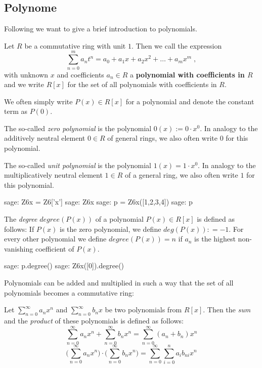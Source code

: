 \subsection{Polynome}
Following \cite{LK} we want to give a brief introduction to polynomials. 
\begin{definition}[Polynomials]
Let $R$ be a commutative ring with unit $1$.
Then we call the expression
\begin{equation}
\sum _{n = 0} ^{m}{a} _{n}{t} ^{n} ={a} _{0} +{a} _{1} x +{a} _{2} x ^ 2 + \dots + a_m x ^ m \;,
\end{equation}
with unknown $x $ and coefficients $ a_n \in R $ a
\textbf{polynomial with coefficients in $R$} and we write $ R [x] $ for the set of all polynomials with coefficients in $R$.
\end{definition}
We often simply write $ P (x) \in R[x]$ for a polynomial and denote the constant term as $ P(0)$.
\begin{example}
\label{def: zero polynomial}
The so-called \textit{zero polynomial} is the polynomial $0(x):=0\cdot x^0$. In analogy to the additively neutral element $ 0 \in R $ of general rings, we also often write $ 0 $ for this polynomial.

The so-called \textit{unit polynomial} is the polynomial $1(x)= 1\cdot x^0$. In analogy to the multiplicatively neutral element $ 1 \in R $ of a general ring, we also often write $ 1 $ for this polynomial.
\end{example}
\begin{sagecommandline}
sage: Z6x = Z6['x']
sage: Z6x
sage: p = Z6x([1,2,3,4])
sage: p
\end{sagecommandline}
\begin{definition}[degree] 
The \textit{degree} $ degree (P (x)) $ of a polynomial
$ P (x) \in R [x] $ is defined as follows: If $ P (x) $ is the zero polynomial, we define $ deg(P (x)): = - 1 $. For every other polynomial we define $ degree (P (x)) = n $ if $ a_n $ is the highest non-vanishing coefficient of $ P (x) $.
\end{definition}
\begin{sagecommandline}
sage: p.degree()
sage: Z6x([0]).degree()
\end{sagecommandline}
Polynomials can be added and multiplied in such a way that the set of all polynomials becomes a commutative ring:
\begin{definition} Let $ \sum _{n = 0} ^{\infty}{a} _{n}{x} ^{n} $ and
$ \sum _{n = 0} ^{\infty}{b} _{n}{x} $ be two polynomials from
$ R[x]$. Then the \textit{sum} and the \textit{product} of these polynomials is defined as follows:
\begin{equation}
\sum _{n = 0} ^{\infty}{a} _{n}{x} ^{n} + \sum _{n = 0} ^{\infty}{b} _{n}{x } ^{n} = \sum _{n = 0} ^{\infty}{({a} _{n} +{b} _{n})}{x} ^{n}
\end{equation}
\begin{equation}
\bigg (\sum _{n = 0} ^{\infty}{a} _{n}{x} ^{n} \bigg) \cdot \bigg (\sum _{n = 0} ^{\infty }{b} _{n}{x} ^{n} \bigg) = \sum _{n = 0} ^{\infty} \sum _{i = 0} ^{n}{a} _{i }{{b} _{ni}}{x} ^{n}
\end{equation}
\end{definition}
